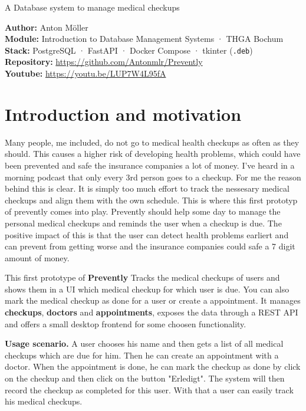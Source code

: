 \documentclass[11pt,a4paper]{article}
\begin{document}
\thispagestyle{empty}
%
{A Database system to manage medical checkups}

\begin{infobox}
\textbf{Author:} Anton Möller \\
\textbf{Module:} Introduction to Database Management Systems · THGA Bochum \\
\textbf{Stack:} PostgreSQL · FastAPI · Docker Compose · tkinter (\texttt{.deb}) \\
\textbf{Repository:} \url{https://github.com/Antonmlr/Prevently} \\
\textbf{Youtube:} \url{https://youtu.be/LUP7W4L95fA}
\end{infobox}

\tableofcontents
\vspace{1em}

\section{Introduction and motivation}

Many people, me included, do not go to medical health checkups as often as they should. This causes a higher risk of developing health problems, which could have been prevented
and safe the insurance companies a lot of money. I've heard in a morning podcast that only every 3rd person goes to a checkup. For me the reason behind this is clear.
It is simply too much effort to track the nessesary medical checkups and align them with the own schedule. This is where this first prototyp of prevently comes into play.
Prevently should help some day to manage the personal medical checkups and reminds the user when a checkup is due. The positive impact of
this is that the user can detect health problems earliert and can prevent from getting worse and the insurance companies could safe a 7 digit amount of money.

This first prototype of \textbf{Prevently} Tracks the medical checkups of users and shows them in a UI which medical checkup for which user is due.
You can also mark the medical checkup as done for a user or create a appointment.
It manages \textbf{checkups}, \textbf{doctors} and \textbf{appointments}, exposes the data
through a REST API and offers a small desktop frontend for some choosen functionality.

\begin{beispielbox}
\textbf{Usage scenario.} A user chooses his name and then gets a list of all medical checkups which are due for him. Then he can create an appointment with a doctor.
When the appointment is done, he can mark the checkup as done by click on the checkup and then click on the button "Erledigt". 
The system will then record the checkup as completed for this user. With that a user can easily track his medical checkups.
\end{beispielbox}
\end{document}
